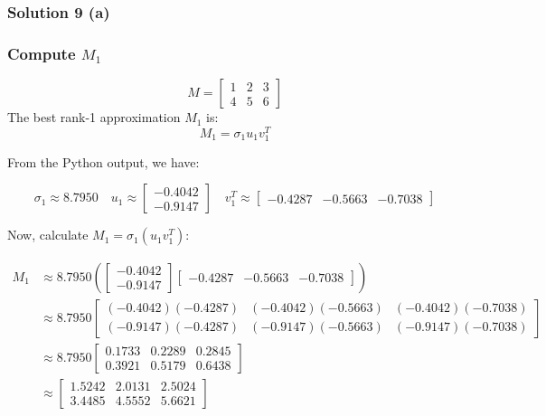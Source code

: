 \documentclass{article}
\begin{document}
{\subsubsection*{Solution 9 (a)}

\subsubsection*{Compute $M_1$}
\[
M =
\begin{bmatrix}
    1 & 2 & 3 \\
    4 & 5 & 6 
\end{bmatrix}
\]
The best rank-1 approximation $M_1$ is: 
$$M_1 = \sigma_1 u_1 v_1^T$$
\begin{flushleft}
  From the Python output, we have:
\end{flushleft}

$$\sigma_1 \approx 8.7950 \quad u_1 \approx \begin{bmatrix} -0.4042 \\ -0.9147 \end{bmatrix} \quad v_1^T \approx \begin{bmatrix} -0.4287 & -0.5663 & -0.7038 \end{bmatrix}$$

\begin{flushleft}
  Now, calculate $M_1 = \sigma_1 (u_1 v_1^T)$:
\end{flushleft}

\begin{align*}
    M_1 &\approx 8.7950 \left( \begin{bmatrix} -0.4042 \\ -0.9147 \end{bmatrix} \begin{bmatrix} -0.4287 & -0.5663 & -0.7038 \end{bmatrix} \right) \\
    &\approx 8.7950 \begin{bmatrix}
        (-0.4042)(-0.4287) & (-0.4042)(-0.5663) & (-0.4042)(-0.7038) \\
        (-0.9147)(-0.4287) & (-0.9147)(-0.5663) & (-0.9147)(-0.7038)
        \end{bmatrix} \\
    &\approx 8.7950 \begin{bmatrix}
        0.1733 & 0.2289 & 0.2845 \\
        0.3921 & 0.5179 & 0.6438
        \end{bmatrix} \\
    &\approx \begin{bmatrix}
        1.5242 & 2.0131 & 2.5024 \\
        3.4485 & 4.5552 & 5.6621
        \end{bmatrix}
\end{align*}

}
\end{document}
